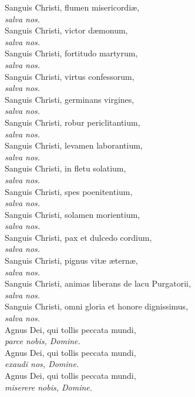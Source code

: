 \documentclass[9pt, twoside]{book}
\begin{document}
{Sanguis Christi, flumen misericordiæ,\\\tab \textit{salva nos.}\\
Sanguis Christi, victor dæmonum,\\\tab \textit{salva nos.}\\
Sanguis Christi, fortitudo martyrum,\\\tab \textit{salva nos.}\\
Sanguis Christi, virtus confessorum,\\\tab \textit{salva nos.}\\
Sanguis Christi, germinans virgines,\\\tab \textit{salva nos.}\\
Sanguis Christi, robur periclitantium,\\\tab \textit{salva nos.}\\
Sanguis Christi, levamen laborantium,\\\tab \textit{salva nos.}\\
Sanguis Christi, in fletu solatium,\\\tab \textit{salva nos.}\\
Sanguis Christi, spes poenitentium,\\\tab \textit{salva nos.}\\
Sanguis Christi, solamen morientium,\\\tab \textit{salva nos.}\\
Sanguis Christi, pax et dulcedo cordium,\\\tab \textit{salva nos.}\\
Sanguis Christi, pignus vitæ æternæ,\\\tab \textit{salva nos.}\\
Sanguis Christi, animas liberans de lacu Purgatorii,\\\tab \textit{salva nos.}\\
Sanguis Christi, omni gloria et honore dignissimus,\\\tab \textit{salva nos.}\\
Agnus Dei, qui tollis peccata mundi,\\\tab \textit{parce nobis, Domine.}\\
Agnus Dei, qui tollis peccata mundi,\\\tab \textit{exaudi nos, Domine.}\\
Agnus Dei, qui tollis peccata mundi,\\\tab \textit{miserere nobis, Domine.}
}

\begin{vresponses}
\end{vresponses}
\vfill
\end{document}
